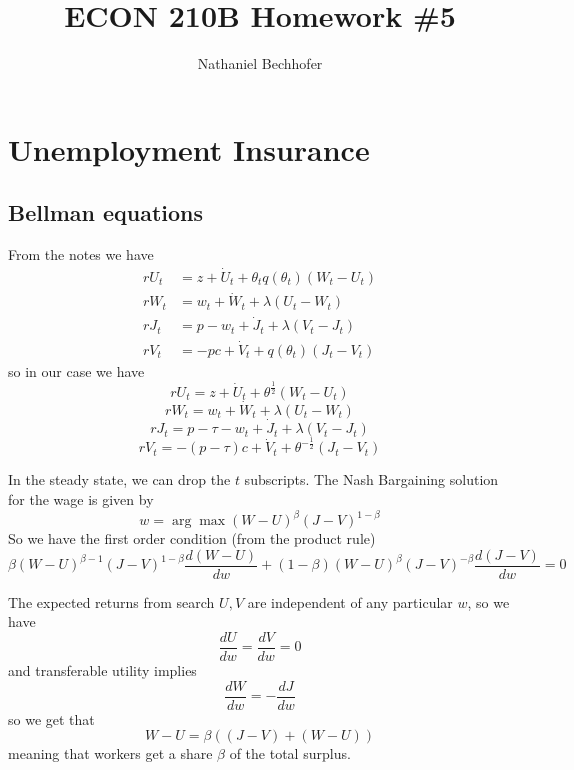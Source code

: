 \documentclass[11pt]{amsart}
\title{ECON 210B Homework \#5}
\author{Nathaniel Bechhofer}
\begin{document}
\maketitle

\section{Unemployment Insurance}

\subsection{Bellman equations}

From the notes we have
\begin{align*}
rU_t &= z + \dot{U}_t + \theta_t q(\theta_t) (W_t - U_t) \\
rW_t &= w_t + \dot{W}_t + \lambda (U_t - W_t) \\
rJ_t &= p - w_t + \dot{J}_t + \lambda (V_t - J_t) \\
rV_t &= -pc + \dot{V}_t + q (\theta_t) (J_t - V_t) 
\end{align*}
so in our case we have
\begin{equation}
rU_t = z + \dot{U}_t + \theta^{\frac{1}{2}} (W_t - U_t)
\end{equation}
\begin{equation}
rW_t = w_t + \dot{W}_t + \lambda (U_t - W_t)
\end{equation}
\begin{equation}
rJ_t = p - \tau - w_t + \dot{J}_t + \lambda (V_t - J_t)
\end{equation}
\begin{equation}
rV_t = -(p - \tau)c + \dot{V}_t + \theta^{-\frac{1}{2}} (J_t - V_t)
\end{equation}

In the steady state, we can drop the $t$ subscripts. The Nash Bargaining solution for the wage is given by
\[
w = \arg \max (W - U)^{\beta} (J - V)^{1-\beta}
\]
So we have the first order condition (from the product rule)
\[
\beta (W - U)^{\beta - 1} (J - V)^{1-\beta} \frac{d (W-U)}{dw} + (1-\beta) (W - U)^{\beta}  (J - V)^{-\beta} \frac{d (J-V)}{dw} = 0
\]

The expected returns from search $U, V$ are independent of any particular $w$, so we have
\[
\frac{dU}{dw} = \frac{dV}{dw} = 0
\]
and transferable utility implies
\[
\frac{dW}{dw} = -\frac{dJ}{dw} 
\]
so we get that
\[
W - U = \beta ((J-V) + (W-U))
\]
meaning that workers get a share $\beta$ of the total surplus.
\end{document}
